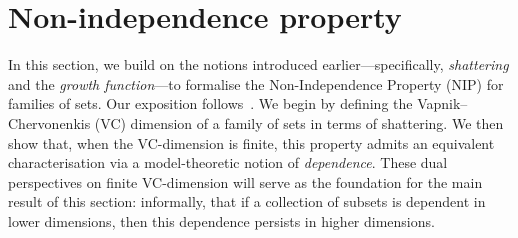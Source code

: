 \section{Non-independence property}

In this section, we build on the notions introduced earlier—specifically, \textit{shattering} and the \textit{growth function}—to formalise the Non-Independence Property (NIP) for families of sets. Our exposition follows~\cite[Chap.~5]{vandenDries1998}. We begin by defining the Vapnik–Chervonenkis (VC) dimension of a family of sets in terms of shattering. We then show that, when the VC-dimension is finite, this property admits an equivalent characterisation via a model-theoretic notion of \textit{dependence}. These dual perspectives on finite VC-dimension will serve as the foundation for the main result of this section: informally, that if a collection of subsets is dependent in lower dimensions, then this dependence persists in higher dimensions.





